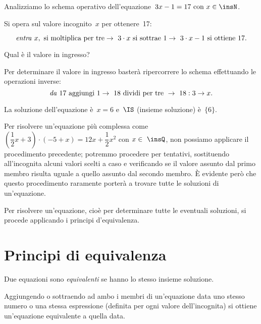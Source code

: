 \begin{exrig}
 \begin{esempio}
Analizziamo lo schema operativo dell'equazione~$3x-1=17 \text{ con } x\in\insN$.

Si opera sul valore incognito~$x$ per ottenere~17:

\[\text{\emph{entra} } x,\text{ si moltiplica per tre}\to~3\cdot x%
\text{ si sottrae } 1\to~3\cdot x-1 \text{ si ottiene } 17.\]

Qual è il valore in ingresso?

Per determinare il valore in ingresso basterà ripercorrere lo schema
 effettuando le operazioni inverse:
\[\text{\emph{da} } 17 \text{ aggiungi } 1\to~18 \text{ dividi per tre }\to~18:3 \to x.\]

La soluzione dell'equazione è~$x = 6$ e~$\IS$ (insieme
soluzione) è~$\{6\}$.
 \end{esempio}
\end{exrig}

\ovalbox{\risolvi \ref{ese:15.1}}\vspace{1.10ex}

Per risolvere un'equazione più complessa come
$\left(\dfrac{1}{2}x+3\right)\cdot (-5+x)=12x+\dfrac{1}{2}x^{2}$ con
$x\in~\insQ$, non possiamo applicare il procedimento precedente; potremmo
procedere per tentativi, sostituendo all'incognita
alcuni valori scelti a caso e verificando se il valore assunto dal
primo membro risulta uguale a quello assunto dal secondo membro. È
evidente però che questo procedimento raramente porterà a trovare
tutte le soluzioni di un'equazione.

\osservazione
Per risolvere un'equazione, cioè per determinare tutte
le eventuali soluzioni, si procede applicando i principi
d'equivalenza.

\section{Principi di equivalenza}

\begin{definizione}
 Due equazioni sono \emph{equivalenti} se hanno lo stesso insieme soluzione.
\end{definizione}

\begin{principio}
 Aggiungendo o sottraendo ad ambo i membri di
un'equazione data uno stesso numero o una stessa
espressione (definita per ogni valore dell'incognita)
si ottiene un'equazione equivalente a quella data.
\end{principio}

